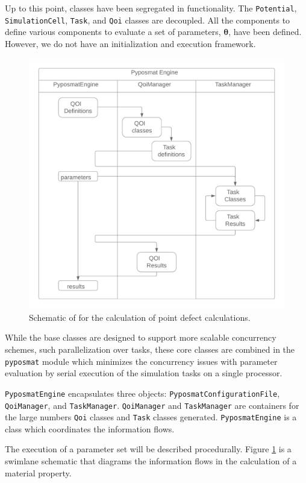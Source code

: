 Up to this point, classes have been segregated in functionality.  The \verb|Potential|, \verb|SimulationCell|, \verb|Task|, and \verb|Qoi| classes are decoupled.  All the components to define various components to evaluate a set of parameters, $\bm{\theta}$, have been defined.  However, we do not have an initialization and execution framework.
\begin{figure}[ht]
	\label{fig:pypospack_coordination}
	\centering
	\includegraphics[width=5in]{chapter6/img/pypospack_coordination}
	\caption{Schematic of for the calculation of point defect calculations.}
\end{figure}

While the base classes are designed to support more scalable concurrency schemes, such parallelization over tasks, these core classes are combined in the \verb|pyposmat| module which minimizes the concurrency issues with parameter evaluation by serial execution of the simulation tasks on a single processor.

\verb|PyposmatEngine| encapsulates three objects: \verb|PyposmatConfigurationFile|, \verb|QoiManager|, and \verb|TaskManager|.
\verb|QoiManager| and \verb|TaskManager| are containers for the large numbers \verb|Qoi| classes and \verb|Task| classes generated.    \verb|PyposmatEngine| is a class which coordinates the information flows.

The execution of a parameter set will be described procedurally.  Figure \ref{fig:pypospack_coordination} is a swimlane schematic that diagrams the information flows in the calculation of a material property.

